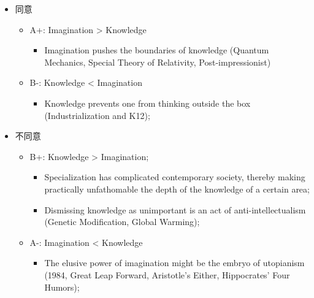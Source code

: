 \documentclass{article}
\begin{document}
  \begin{itemize}
    \item 同意
    \begin{itemize}
      \item A+: Imagination > Knowledge
      \begin{itemize}
        \item Imagination pushes the boundaries of knowledge
        (Quantum Mechanics, Special Theory of Relativity, Post-impressionist)
      \end{itemize}

      \item B-: Knowledge < Imagination
      \begin{itemize}
        \item Knowledge prevents one from thinking outside the box
        (Industrialization and K12);
      \end{itemize}
    \end{itemize}

    \item 不同意
    \begin{itemize}
      \item B+: Knowledge > Imagination;
      \begin{itemize}
        \item Specialization has complicated contemporary society, thereby
        making practically unfathomable the depth of the knowledge of a certain
        area; 
        \item Dismissing knowledge as unimportant is an act of
        anti-intellectualism (Genetic Modification, Global Warming);
      \end{itemize}

      \item A-: Imagination < Knowledge
      \begin{itemize}
        \item The elusive power of imagination might be the embryo of
        utopianism (1984, Great Leap Forward, Aristotle’s Either,
        Hippocrates’ Four Humors);
      \end{itemize}
    \end{itemize}
  \end{itemize}
\end{document}

